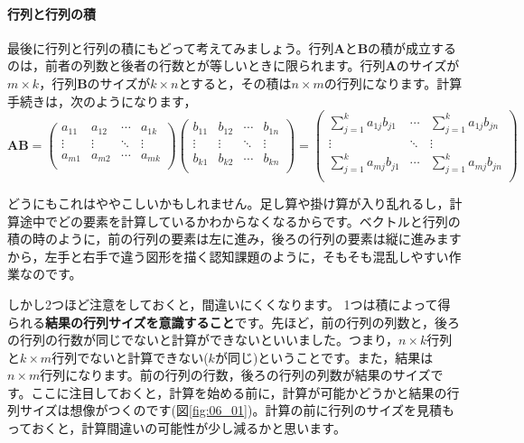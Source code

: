 \documentclass{ltjsbook}
\begin{document}
\paragraph{行列と行列の積}
最後に行列と行列の積にもどって考えてみましょう。行列$\bm{A}$と$\bm{B}$の積が成立するのは，前者の列数と後者の行数とが等しいときに限られます。行列$\bm{A}$のサイズが$m \times k$，行列$\bm{B}$のサイズが$k \times n$とすると，その積は$n \times m$の行列になります。計算手続きは，次のようになります，
\begin{equation*}
	\bm{A} \bm{B} =
	\begin{pmatrix}
		a_{11} & a_{12} & \cdots & a_{1k} \\
		\vdots & \vdots & \ddots & \vdots \\
		a_{m1} & a_{m2} & \cdots & a_{mk} \\
	\end{pmatrix}
	\begin{pmatrix}
		b_{11} & b_{12} & \cdots & b_{1n} \\
		\vdots & \vdots & \ddots & \vdots \\
		b_{k1} & b_{k2} & \cdots & b_{kn} \\
	\end{pmatrix}
	=
	\begin{pmatrix}
		\sum_{j=1}^{k} a_{1j} b_{j1} & \cdots & \sum_{j=1}^{k} a_{1j} b_{jn} \\
		\vdots                       & \ddots & \vdots                       \\
		\sum_{j=1}^{k} a_{mj} b_{j1} & \cdots & \sum_{j=1}^{k} a_{mj} b_{jn} \\
	\end{pmatrix}
\end{equation*}


どうにもこれはややこしいかもしれません。足し算や掛け算が入り乱れるし，計算途中でどの要素を計算しているかわからなくなるからです。ベクトルと行列の積の時のように，前の行列の要素は左に進み，後ろの行列の要素は縦に進みますから，左手と右手で違う図形を描く認知課題のように，そもそも混乱しやすい作業なのです。

しかし2つほど注意をしておくと，間違いにくくなります。
1つは積によって得られる\textbf{結果の行列サイズを意識すること}です。先ほど，前の行列の列数と，後ろの行列の行数が同じでないと計算ができないといいました。つまり，$n \times k$行列と$k \times m$行列でないと計算できない($k$が同じ)ということです。また，結果は$n \times m$行列になります。前の行列の行数，後ろの行列の列数が結果のサイズです。ここに注目しておくと，計算を始める前に，計算が可能かどうかと結果の行列サイズは想像がつくのです(図\ref{fig:06_01})。計算の前に行列のサイズを見積もっておくと，計算間違いの可能性が少し減るかと思います。
\end{document}
